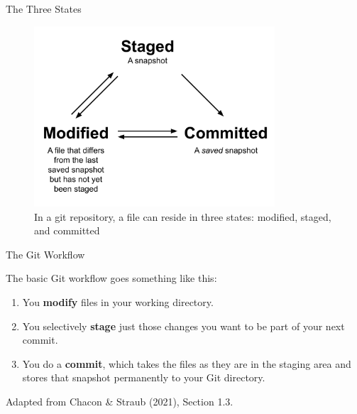 \documentclass[handout]{beamer}
\begin{document}
\begin{frame}{The Three States}
  \begin{figure}
	  \includegraphics[width=0.8\textwidth]{figures/git_states.pdf}
	  \caption{In a git repository, a file can reside in three states: modified, staged, and committed}
  \end{figure} 
\end{frame}

\begin{frame}{The Git Workflow}
  \begin{exampleblock}{The basic Git workflow goes something like this:}
    \begin{enumerate}
      \item You \textbf{modify} files in your working directory.
      \item You selectively \textbf{stage} just those changes you want to be part of your next commit.
      \item You do a \textbf{commit}, which takes the files as they are in the staging area and stores that snapshot permanently to your Git directory.
    \end{enumerate}
  \end{exampleblock}
  {\scriptsize Adapted from Chacon \& Straub (2021), Section 1.3.}
\end{frame}
\end{document}
